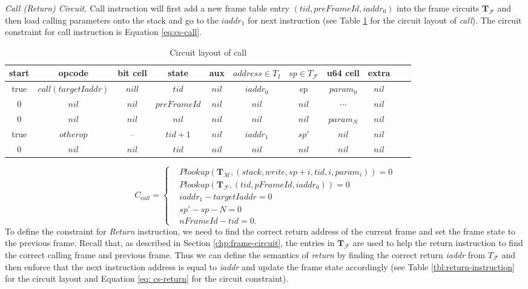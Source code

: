 \noindent\emph{Call (Return) Circuit.}
Call instruction will first add a new frame table entry $(tid, preFrameId, iaddr_0)$ into the frame circuits $\mathbf{T}_\mathcal{F}$ and then load calling parameters onto the stack and go to the $iaddr_1$ for next instruction (see Table \ref{tbl:call-instruction} for the circuit layout of \emph{call}). The circuit constraint for call instruction is Equation \ref{eq:cs-call}.
\begin{table}[!h]
\small
\begin{center}
\caption{Circuit layout of call}
\label{tbl:call-instruction}
\begin{tabular}{ | c | c | c | c | c | c | c | c | c | c | c | }
  \hline
  start & opcode & bit cell & state & aux & $address \in T_{I}$ & $sp \in T_\mathcal{F}$& u64 cell & extra \\ 
  \hline
   true & $call(targetIaddr)$ & $nill$ & $tid$ & $nil$ & $iaddr_0$ & sp & $param_0$ & $nil$\\ 
 \hline
   0 & $nil$ & $nil$ & $preFrameId$ & $nil$ & $nil$ & $nil$ & $\cdots$ & $nil$\\ 
 \hline
   0 & $nil$ & $nil$ & $nil$ & $nil$ & $nil$ & $nil$ & $param_N$ & $nil$\\ 
 \hline
   true & $otherop$ & -- & $tid + 1$ & $nil$ & $iaddr_1$ & $sp'$ & $nil$ & $nil$\\
 \hline
   0 & $nil$ & $nil$ & $tid$ & $nil$ & $nil$ & $nil$ & $nil$ & $nil$\\ 
 \hline
\end{tabular}

\end{center}
\end{table}
\begin{equation}
    C_{call} = \begin{cases}
        &Plookup(\mathbf{T}_\mathcal{M}, (stack, write, sp+i, tid, i, param_i)) = 0 \\
        &Plookup(\mathbf{T}_\mathcal{F}, (tid, pFrameId, iaddr_0)) = 0 \\
        &iaddr_1 - targetIaddr = 0\\
        &sp' - sp - N = 0 \\
        &nFrameId - tid = 0.
    \end{cases}
\label{eq:cs-call}
\end{equation}
 To define the constraint for \emph{Return} instruction, we need to find the correct return address of the current frame and set the frame state to the previous frame. Recall that, as described in Section \ref{chp:frame-circuit}, the entries in $\mathbf{T}_\mathcal{F}$ are used to help the return instruction to find the correct calling frame and previous frame. Thus we can define the semantics of \emph{return} by finding the correct return \emph{iaddr} from $T_\mathcal{F}$ and then enforce that the next instruction address is equal to \emph{iaddr} and update the frame state accordingly (see Table \ref{tbl:return-instruction} for the circuit layout and Equation \ref{eq: cs-return} for the circuit constraint).

